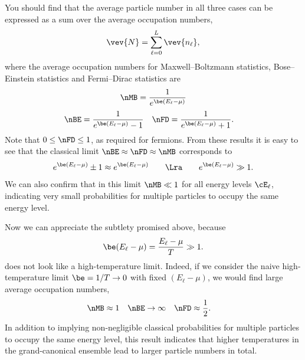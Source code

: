 You should find that the average particle number in all three cases can be expressed as a sum over the average occupation numbers,
\begin{equation*}
  \vev{N} = \sum_{\ell = 0}^L \vev{n_{\ell}},
\end{equation*}
where the average occupation numbers for Maxwell--Boltzmann statistics, Bose--Einstein statistics and Fermi--Dirac statistics are
\begin{equation*}
  \nMB = \frac{1}{e^{\be (E_{\ell} - \mu)}}
\end{equation*}
\begin{align*}
  \nBE & = \frac{1}{e^{\be (E_{\ell} - \mu)} - 1} &
  \nFD & = \frac{1}{e^{\be (E_{\ell} - \mu)} + 1}.
\end{align*}
Note that $0 \leq \nFD \leq 1$, as required for fermions.
From these results it is easy to see that the classical limit $\nBE \approx \nFD \approx \nMB$ corresponds to
\begin{equation*}
  e^{\be (E_{\ell} - \mu)} \pm 1 \approx e^{\be (E_{\ell} - \mu)} \qquad \Lra \qquad e^{\be (E_{\ell} - \mu)} \gg 1.
\end{equation*}
We can also confirm that in this limit $\nMB \ll 1$ for all energy levels $\cE_{\ell}$, indicating very small probabilities for multiple particles to occupy the same energy level.

Now we can appreciate the subtlety promised above, because
\begin{equation}
  \label{eq:highT_ratio}
  \be (E_{\ell} - \mu) = \frac{E_{\ell} - \mu}{T} \gg 1.
\end{equation}
does not look like a high-temperature limit.
Indeed, if we consider the naive high-temperature limit $\be = 1 / T \to 0$ with fixed $(E_{\ell} - \mu)$, we would find large average occupation numbers,
\begin{align*}
  \nMB & \approx 1 &
  \nBE & \to \infty & 
  \nFD & \approx \frac{1}{2}.
\end{align*}
In addition to implying non-negligible classical probabilities for multiple particles to occupy the same energy level, this result indicates that higher temperatures in the grand-canonical ensemble lead to larger particle numbers in total.


